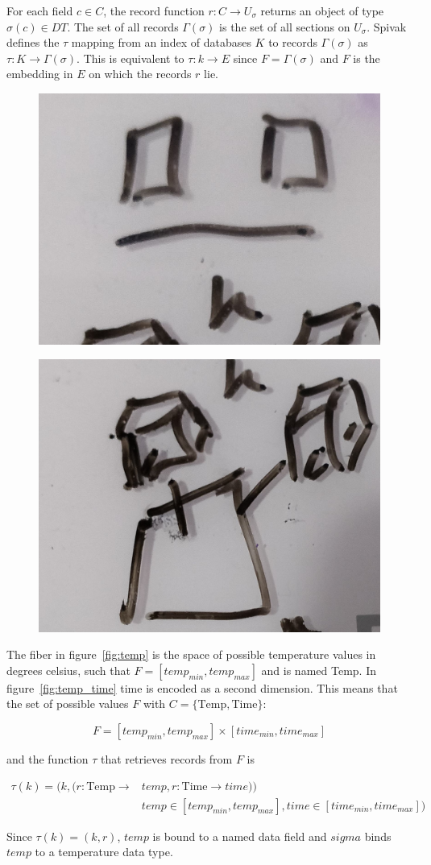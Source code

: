 \documentclass[../main.tex]{subfiles}
\begin{document}
For each field $c \in C$, the record function $r: C \rightarrow U_{\sigma}$ returns an object of type $\sigma(c) \in DT$. The set of all records $\Gamma(\sigma)$ is the set of all sections on $U_\sigma$. Spivak defines the $\tau$ mapping from an index of databases $K$ to records $\Gamma(\sigma)$ as $\tau: K \rightarrow \Gamma(\sigma)$. This is equivalent to $\tau: k \rightarrow E$ since $F = \Gamma(\sigma)$ and $F$ is the embedding in $E$ on which the records $r$ lie.
 

\begin{figure}[ht]
    \includegraphics[width=0.2\linewidth]{figures/sections/math/temp_2f.png}
    \label{fig:}
\end{figure}
\begin{figure}[ht]
    \includegraphics[width=0.2\linewidth]{figures/sections/math/temp_3f.png}
\end{figure}


The fiber in figure~\ref{fig:temp} is the space of possible temperature values in degrees celsius, such that $F=[temp_{min}, temp_{max}]$ and is named \textrm{Temp}. In figure~\ref{fig:temp_time} \textrm{time} is encoded as a second dimension. This means that the set of possible values $F$ with $C=\{\textrm{Temp}, \textrm{Time}\}$:

\begin{equation}
F = [temp_{min}, temp_{max}] \times [time_{min}, time_{max}]
\end{equation}

and the function $\tau$ that retrieves records from $F$ is

\begin{align}
\tau(k) =(k, (r: \textrm{Temp}\rightarrow &temp, r: \textrm{Time}\rightarrow time))\\
&temp \in [temp_{min}, temp_{max}], time \in [time_{min}, time_{max}])
\end{align}

Since $\tau(k)=(k, r)$, $temp$ is bound to a named data field and $sigma$ binds $temp$ to a temperature data type. 
\end{document}
